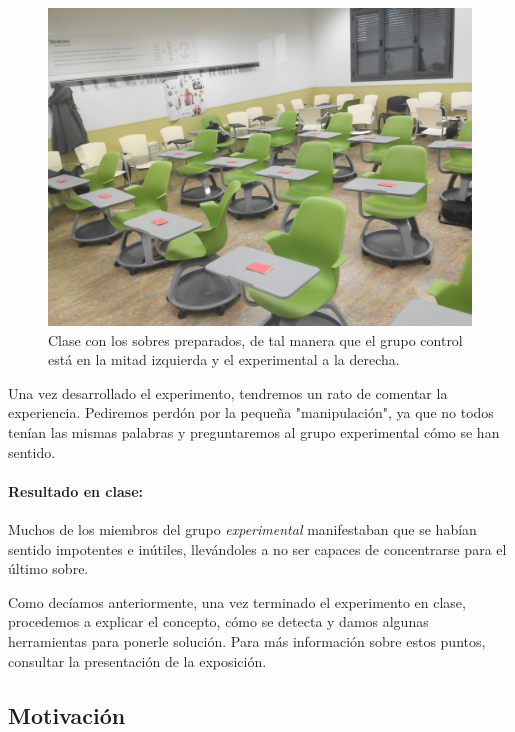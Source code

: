 \begin{figure}[hbtp]
\centering
\includegraphics[scale=0.25]{img/clase.jpeg}
\caption{Clase con los sobres preparados, de tal manera que el grupo control está en la mitad izquierda y el experimental a la derecha.}
\label{imgclase}
\end{figure}


Una vez desarrollado el experimento, tendremos un rato de comentar la experiencia. 
%
Pediremos perdón por la pequeña "manipulación", ya que no todos tenían las mismas palabras y preguntaremos al grupo experimental cómo se han sentido.

\paragraph{Resultado en clase:} Muchos de los miembros del grupo \textit{experimental} manifestaban que se habían sentido impotentes e inútiles, llevándoles a no ser capaces de concentrarse para el último sobre.

Como decíamos anteriormente, una vez terminado el experimento en clase, procedemos a explicar el concepto, cómo se detecta y damos algunas herramientas para ponerle solución. 
%
Para más información sobre estos puntos, consultar la presentación de la exposición.


\subsection{Motivación}

